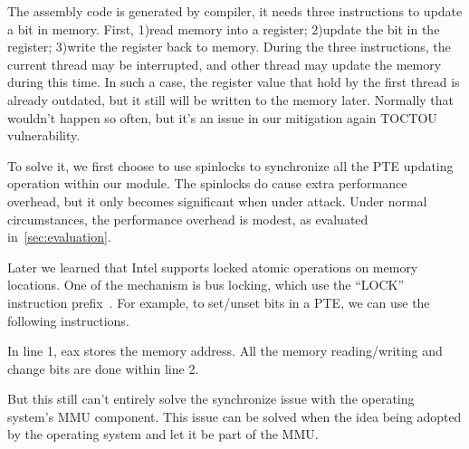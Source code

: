 

The assembly code is generated by compiler, it needs three instructions to update a bit in memory. First, 1)read memory into a register; 2)update the bit in the register; 3)write the register back to memory. During the three instructions, the current thread may be interrupted, and other thread may update the memory during this time. In such a case, the register value that hold by the first thread is already outdated, but it still will be written to the memory later. Normally that wouldn't happen so often, but it's an issue in our mitigation again TOCTOU vulnerability.

To solve it, we first choose to use spinlocks to synchronize all the PTE updating operation within our module. The spinlocks do cause extra performance overhead, but it only becomes significant when under attack. Under normal circumstances, the performance overhead is modest, as evaluated in~\autoref{sec:evaluation}.  

Later we learned that Intel supports locked atomic operations on memory locations. One of the mechanism is bus locking, which use the ``LOCK'' instruction prefix~\cite{intelmanualchapter8}. For example, to set/unset bits in a PTE, we can use the following instructions.


In line 1, eax stores the memory address. All the memory reading/writing and change bits are done within line 2.

But this still can't entirely solve the synchronize issue with the operating system's MMU component. This issue can be solved when the idea being adopted by the operating system and let it be part of the MMU. 

